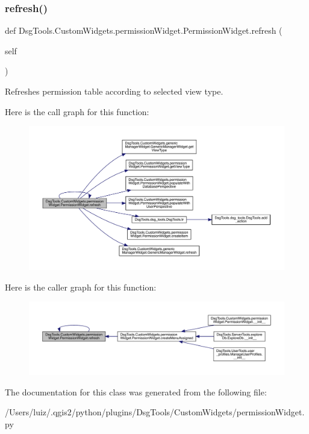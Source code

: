 \mbox{\label{class_dsg_tools_1_1_custom_widgets_1_1permission_widget_1_1_permission_widget_a34802d043d5d68476477f593e0e0c4b0}} 
\subsubsection{\texorpdfstring{refresh()}{refresh()}}
{\footnotesize\ttfamily def Dsg\+Tools.\+Custom\+Widgets.\+permission\+Widget.\+Permission\+Widget.\+refresh (\begin{DoxyParamCaption}\item[{}]{self }\end{DoxyParamCaption})}

\begin{DoxyVerb}Refreshes permission table according to selected view type.
\end{DoxyVerb}
 Here is the call graph for this function\+:
\nopagebreak
\begin{figure}[H]
\begin{center}
\leavevmode
\includegraphics[width=350pt]{class_dsg_tools_1_1_custom_widgets_1_1permission_widget_1_1_permission_widget_a34802d043d5d68476477f593e0e0c4b0_cgraph}
\end{center}
\end{figure}
Here is the caller graph for this function\+:
\nopagebreak
\begin{figure}[H]
\begin{center}
\leavevmode
\includegraphics[width=350pt]{class_dsg_tools_1_1_custom_widgets_1_1permission_widget_1_1_permission_widget_a34802d043d5d68476477f593e0e0c4b0_icgraph}
\end{center}
\end{figure}


The documentation for this class was generated from the following file\+:\begin{DoxyCompactItemize}
\item 
/\+Users/luiz/.\+qgis2/python/plugins/\+Dsg\+Tools/\+Custom\+Widgets/permission\+Widget.\+py\end{DoxyCompactItemize}
